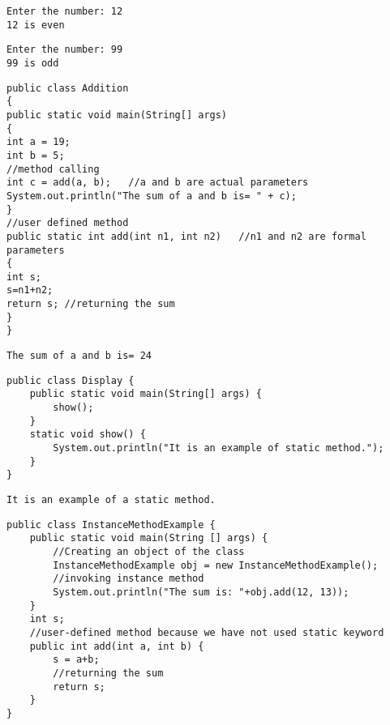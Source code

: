 \documentclass{book}
\def\lthtmlcheckvsize{\ifdim\ht\sizebox<\vsize 
  \ifdim\wd\sizebox<\hsize\expandafter\hfill\fi \expandafter\vfill
  \else\expandafter\vss\fi}%
\begin{document}
{\newpage\clearpage
{}%
\begin{lstlisting}
Enter the number: 12
12 is even
\end{lstlisting}%
\lthtmlfigureZ
\lthtmlcheckvsize\clearpage}

{\newpage\clearpage
{}%
\begin{lstlisting}
Enter the number: 99
99 is odd
\end{lstlisting}%
\lthtmlfigureZ
\lthtmlcheckvsize\clearpage}

{\newpage\clearpage
{}%
\begin{lstlisting}
public class Addition   
{  
public static void main(String[] args)   
{  
int a = 19;  
int b = 5;  
//method calling  
int c = add(a, b);   //a and b are actual parameters  
System.out.println("The sum of a and b is= " + c);  
}  
//user defined method  
public static int add(int n1, int n2)   //n1 and n2 are formal parameters  
{  
int s;  
s=n1+n2;  
return s; //returning the sum  
}  
}  
\end{lstlisting}%
\lthtmlfigureZ
\lthtmlcheckvsize\clearpage}

{\newpage\clearpage
{}%
\begin{lstlisting}
The sum of a and b is= 24
\end{lstlisting}%
\lthtmlfigureZ
\lthtmlcheckvsize\clearpage}

{\newpage\clearpage
{}%
\begin{lstlisting}
public class Display {  
	public static void main(String[] args) {  
		show();  
	}  
	static void show() {  
		System.out.println("It is an example of static method.");  
	}  
}  
\end{lstlisting}%
\lthtmlfigureZ
\lthtmlcheckvsize\clearpage}

{\newpage\clearpage
{}%
\begin{lstlisting}
It is an example of a static method.
\end{lstlisting}%
\lthtmlfigureZ
\lthtmlcheckvsize\clearpage}

{\newpage\clearpage
{}%
\begin{lstlisting}
public class InstanceMethodExample {  
	public static void main(String [] args) {  
		//Creating an object of the class  
		InstanceMethodExample obj = new InstanceMethodExample();  
		//invoking instance method   
		System.out.println("The sum is: "+obj.add(12, 13));  
	}  
	int s;  
	//user-defined method because we have not used static keyword  
	public int add(int a, int b) {  
		s = a+b;  
		//returning the sum  
		return s;  
	}  
}  
\end{lstlisting}%
\lthtmlfigureZ
\lthtmlcheckvsize\clearpage}
\end{document}
